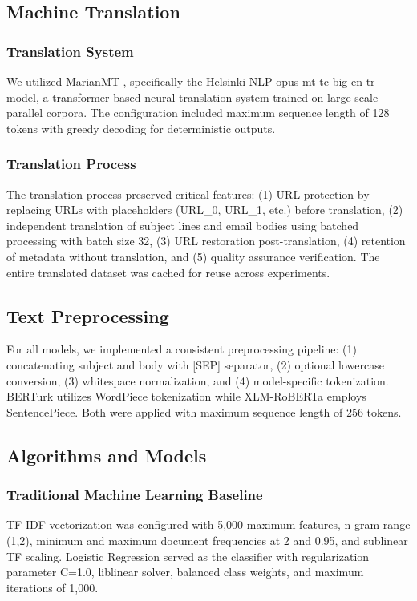 \documentclass[conference]{IEEEtran}
\begin{document}
\subsection{Machine Translation}

\subsubsection{Translation System}
We utilized MarianMT \cite{12}, specifically the Helsinki-NLP opus-mt-tc-big-en-tr model, a transformer-based neural translation system trained on large-scale parallel corpora. The configuration included maximum sequence length of 128 tokens with greedy decoding for deterministic outputs.

\subsubsection{Translation Process}
The translation process preserved critical features: (1) URL protection by replacing URLs with placeholders (URL\_0, URL\_1, etc.) before translation, (2) independent translation of subject lines and email bodies using batched processing with batch size 32, (3) URL restoration post-translation, (4) retention of metadata without translation, and (5) quality assurance verification. The entire translated dataset was cached for reuse across experiments.

\subsection{Text Preprocessing}

For all models, we implemented a consistent preprocessing pipeline: (1) concatenating subject and body with [SEP] separator, (2) optional lowercase conversion, (3) whitespace normalization, and (4) model-specific tokenization. BERTurk utilizes WordPiece tokenization while XLM-RoBERTa employs SentencePiece. Both were applied with maximum sequence length of 256 tokens.

\subsection{Algorithms and Models}

\subsubsection{Traditional Machine Learning Baseline}
TF-IDF vectorization was configured with 5,000 maximum features, n-gram range (1,2), minimum and maximum document frequencies at 2 and 0.95, and sublinear TF scaling. Logistic Regression served as the classifier with regularization parameter C=1.0, liblinear solver, balanced class weights, and maximum iterations of 1,000.
\end{document}
